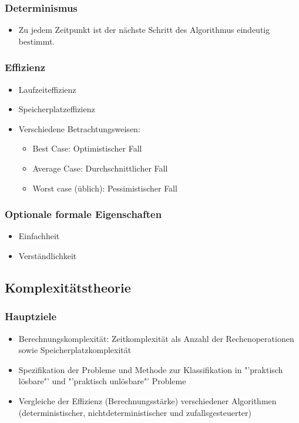 \subsubsection{Determinismus}
    \begin{itemize}
	    \item Zu jedem Zeitpunkt ist der nächste Schritt des Algorithmus eindeutig bestimmt.
    \end{itemize}
\subsubsection{Effizienz}
    \begin{itemize}
	    \item Laufzeiteffizienz
	    \item Speicherplatzeffizienz
	    \item Verschiedene Betrachtungsweisen:
	    \begin{itemize}
	        \item Best Case: Optimistischer Fall
	        \item Average Case: Durchschnittlicher Fall
	        \item Worst case (üblich): Pessimistischer Fall
	    \end{itemize}
    \end{itemize}
\subsubsection{Optionale formale Eigenschaften}
    \begin{itemize}
	    \item Einfachheit
	    \item Verständlichkeit
    \end{itemize}


\subsection{Komplexitätstheorie}
\subsubsection{Hauptziele}
    \begin{itemize}
        \item Berechnungskomplexität: Zeitkomplexität als Anzahl der Rechenoperationen sowie Speicherplatzkomplexität
        \item Spezifikation der Probleme und Methode zur Klassifikation in "'praktisch lösbare"' und "'praktisch unlösbare"' Probleme
        \item Vergleiche der Effizienz (Berechnungsstärke) verschiedener Algorithmen (deterministischer, nichtdeterministischer und zufallsgesteuerter)
    \end{itemize}
